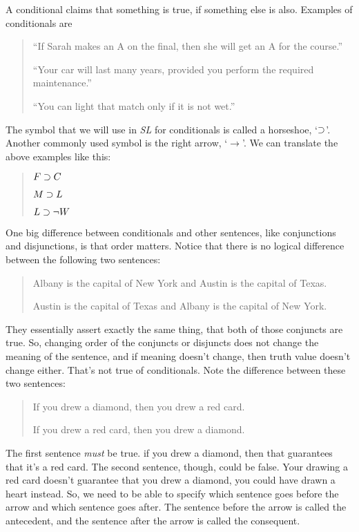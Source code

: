 \documentclass[../logic-text.tex]{subfiles}
\begin{document}
A conditional claims that something is true, if something else is also. Examples of conditionals are

\begin{quote}
  ``If Sarah makes an A on the final, then she will get an A for the course.''

  ``Your car will last many years, provided you perform the required maintenance.''

  ``You can light that match only if it is not wet.''
\end{quote}


The symbol that we will use in \emph{SL} for conditionals is called a horseshoe, \enquote*{\(\supset\)}. Another commonly used symbol is the right arrow, \enquote*{\(\rightarrow\)}.
We can translate the above examples like this:

\begin{quote}


  \(F \supset C\)

  \(M \supset L\)

  \(L \supset \neg W\)
\end{quote}



One big difference between conditionals and other sentences, like conjunctions and disjunctions, is that order matters. Notice that there is no logical difference between the following two sentences:

\begin{quote}


  Albany is the capital of New York and Austin is the capital of Texas.

  Austin is the capital of Texas and Albany is the capital of New York.
\end{quote}

They essentially assert exactly the same thing, that both of those conjuncts are true. So, changing order of the conjuncts or disjuncts does not change the meaning of the sentence, and if meaning doesn't change, then truth value doesn't change either.
That's not true of conditionals. Note the difference between these two sentences:

\begin{quote}


  If you drew a diamond, then you drew a red card.

  If you drew a red card, then you drew a diamond.
\end{quote}

The first sentence \emph{must} be true. if you drew a diamond, then that guarantees that it's a red card. The second sentence, though, could be false. Your drawing a red card doesn't guarantee that you drew a diamond, you could have drawn a heart instead. So, we need to be able to specify which sentence goes before the arrow and which sentence goes after. The sentence before the arrow is called the antecedent, and the sentence after the arrow is called the consequent.
\end{document}

